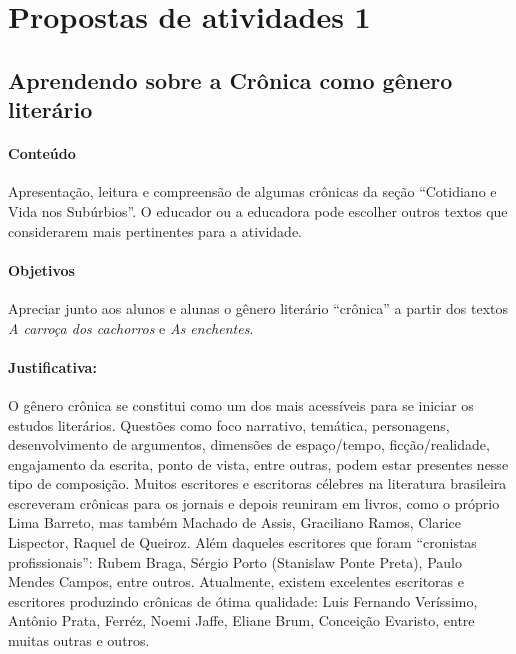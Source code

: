 \documentclass[11pt]{extarticle}
\begin{document}
\section{Propostas de atividades 1}


\subsection{Aprendendo sobre a Crônica como gênero literário}



\paragraph{Conteúdo} Apresentação, leitura e compreensão de algumas
crônicas da seção ``Cotidiano e Vida nos Subúrbios''. O educador ou a
educadora pode escolher outros textos que considerarem mais pertinentes
para a atividade.


\paragraph{Objetivos} Apreciar junto aos alunos e alunas o gênero
literário ``crônica'' a partir dos textos {\textit{A carroça dos
cachorros}} e {\textit{As enchentes}.}


\paragraph{Justificativa:} O gênero crônica se constitui como um dos mais
acessíveis para se iniciar os estudos literários. Questões como foco
narrativo, temática, personagens, desenvolvimento de argumentos,
dimensões de espaço/tempo, ficção/realidade, engajamento da escrita,
ponto de vista, entre outras, podem estar presentes nesse tipo de
composição. Muitos escritores e escritoras célebres na literatura
brasileira escreveram crônicas para os jornais e depois reuniram em
livros, como o próprio Lima Barreto, mas também Machado de Assis,
Graciliano Ramos, Clarice Lispector, Raquel de Queiroz. Além daqueles
escritores que foram ``cronistas profissionais'': Rubem Braga, Sérgio
Porto (Stanislaw Ponte Preta), Paulo Mendes Campos, entre outros.
Atualmente, existem excelentes escritoras e escritores produzindo
crônicas de ótima qualidade: Luis Fernando Veríssimo, Antônio Prata,
Ferréz, Noemi Jaffe, Eliane Brum, Conceição Evaristo, entre muitas
outras e outros.
\end{document}
